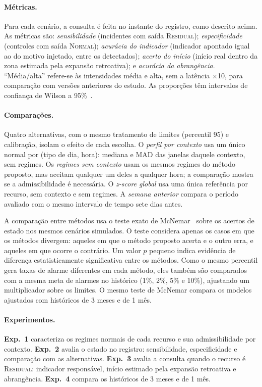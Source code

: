 \documentclass[sigconf,nonacm]{acmart}
\newcommand{\Normal}{\textsc{Normal}\xspace}
\newcommand{\Residual}{\textsc{Residual}\xspace}
\begin{document}
\paragraph{Métricas.} Para cada cenário, a consulta é feita no instante do registro, como descrito acima. As métricas são: \emph{sensibilidade} (incidentes com saída \Residual); \emph{especificidade} (controles com saída \Normal); \emph{acurácia do indicador} (indicador apontado igual ao do motivo injetado, entre os detectados); \emph{acerto do início} (início real dentro da zona estimada pela expansão retroativa); e \emph{acurácia da abrangência}. ``Média/alta'' refere-se às intensidades média e alta, sem a latência $\times$10, para comparação com versões anteriores do estudo. As proporções têm intervalos de confiança de Wilson a 95\%~\citep{wilson1927probable}.

\paragraph{Comparações.} Quatro alternativas, com o mesmo tratamento de limites (percentil 95) e calibração, isolam o efeito de cada escolha. O \emph{perfil por contexto} usa um único normal por (tipo de dia, hora): mediana e MAD das janelas daquele contexto, sem regimes. Os \emph{regimes sem contexto} usam os mesmos regimes do método proposto, mas aceitam qualquer um deles a qualquer hora; a comparação mostra se a admissibilidade é necessária. O \emph{z-score global} usa uma única referência por recurso, sem contexto e sem regimes. A \emph{semana anterior} compara o período avaliado com o mesmo intervalo de tempo sete dias antes.

A comparação entre métodos usa o teste exato de McNemar~\citep{mcnemar1947note} sobre os acertos de estado nos mesmos cenários simulados. O teste considera apenas os casos em que os métodos divergem: aqueles em que o método proposto acerta e o outro erra, e aqueles em que ocorre o contrário. Um valor $p$ pequeno indica evidência de diferença estatisticamente significativa entre os métodos. Como o mesmo percentil gera taxas de alarme diferentes em cada método, eles também são comparados com a mesma meta de alarmes no histórico (1\%, 2\%, 5\% e 10\%), ajustando um multiplicador sobre os limites. O mesmo teste de McNemar compara os modelos ajustados com históricos de 3 meses e de 1 mês.

\paragraph{Experimentos.} \textbf{Exp.~1} caracteriza os regimes normais de cada recurso e sua admissibilidade por contexto. \textbf{Exp.~2} avalia o estado no registro: sensibilidade, especificidade e comparação com as alternativas. \textbf{Exp.~3} avalia a consulta quando o recurso é \Residual: indicador responsável, início estimado pela expansão retroativa e abrangência. \textbf{Exp.~4} compara os históricos de 3 meses e de 1 mês.
\end{document}
